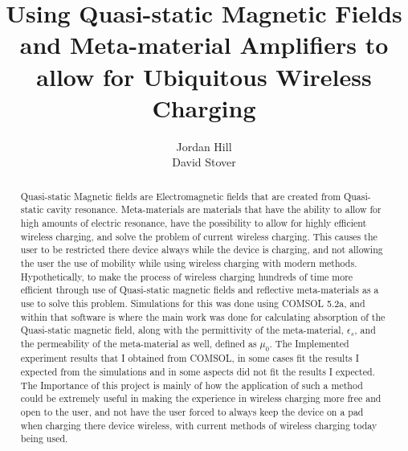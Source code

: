 \documentclass[]{article}
\title{Using Quasi-static Magnetic Fields and Meta-material Amplifiers to allow for Ubiquitous Wireless Charging}
\author{Jordan Hill \\ David Stover}
\begin{document}
\maketitle
\pagebreak

\begin{abstract}
Quasi-static Magnetic fields are Electromagnetic fields that are created from Quasi-static cavity resonance. Meta-materials are materials that have the ability to allow for high amounts of electric resonance, have the possibility to allow for highly efficient wireless charging, and solve the problem of current wireless charging. This causes the user to be restricted there device always while the device is charging, and not allowing the user the use of mobility while using wireless charging with modern methods. Hypothetically, to make the process of wireless charging hundreds of time more efficient through use of Quasi-static magnetic fields and reflective meta-materials as a use to solve this problem. Simulations for this was done using COMSOL 5.2a, and within that software is where the main work was done for calculating absorption of the Quasi-static magnetic field, along with the permittivity of the meta-material, $\epsilon_s$, and the permeability of the meta-material as well, defined as $\mu_0$. The Implemented experiment results that I obtained from COMSOL, in some cases fit the results I expected from the simulations and in some aspects did not fit the results I expected. The Importance of this project is mainly of how the application of such a method could be extremely useful in making the experience in wireless charging more free and open to the user, and not have the user forced to always keep the device on a pad when charging there device wireless, with current methods of wireless charging today being used.
\end{abstract}

\pagebreak
\end{document}
